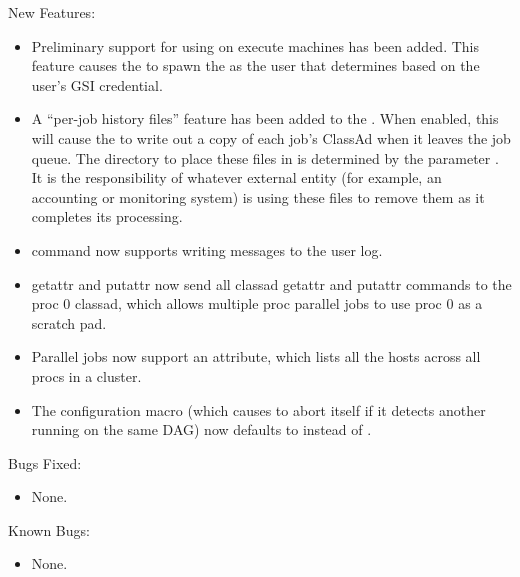 \noindent New Features:

\begin{itemize}


\item Preliminary support for using  on execute machines
has been added.  This feature causes the  to spawn the
 as the user that  determines based on
the user's GSI credential.

\item A ``per-job history files'' feature has been added to the
. When enabled, this will cause the  to
write out a copy of each job's ClassAd when it leaves the job
queue. The directory to place these files in is determined by the
parameter . It is the responsibility of
whatever external entity (for example, an accounting or monitoring system) is
using these files to remove them as it completes its processing.

\item {} command now supports writing messages to the user log.

\item {} getattr and putattr now send all classad getattr
and putattr commands to the proc 0 classad, which allows multiple proc
parallel jobs to use proc 0 as a scratch pad.

\item Parallel jobs now support an  attribute,
which lists all the hosts across all procs in a cluster.

\item The  configuration macro (which causes
 to abort itself if it detects another 
running on the same DAG) now defaults to  instead of
.

\end{itemize}

\noindent Bugs Fixed:

\begin{itemize}

\item None.

\end{itemize}

\noindent Known Bugs:

\begin{itemize}

\item None.

\end{itemize}

